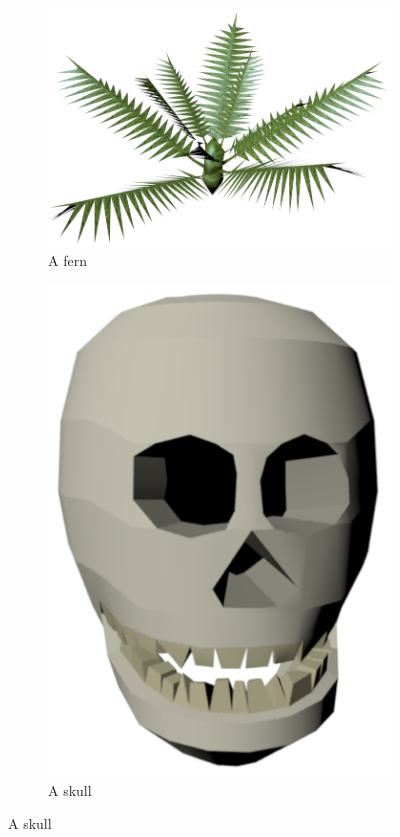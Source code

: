 \begin{figure}[h!]
    \centering
    \begin{subfigure}[b]{0.3\textwidth}
    	\centering
        \includegraphics[scale=0.2]{figures/fern.png}\caption{A fern\label{fig:fern}}
    \end{subfigure}
    \begin{subfigure}[b]{0.3\textwidth}
    	\centering
        \includegraphics[scale=0.2]{figures/skull.png}\caption{A skull\label{fig:skull}}
    \end{subfigure}

\end{figure}
